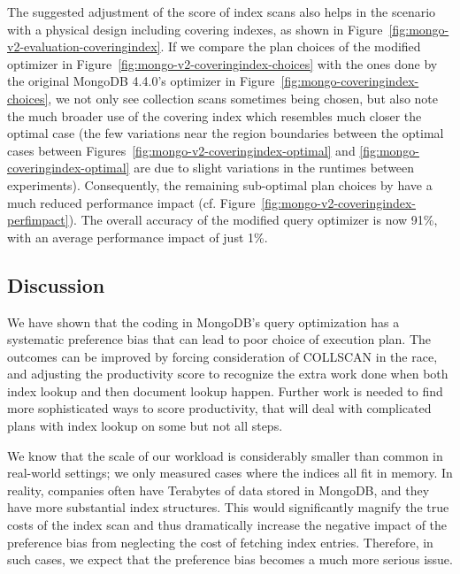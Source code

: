 The suggested adjustment of the score of index scans also helps in the scenario with a physical design including covering indexes, as shown in Figure~\ref{fig:mongo-v2-evaluation-coveringindex}. If we compare the plan choices of the modified \approachName optimizer in Figure~\ref{fig:mongo-v2-coveringindex-choices} with the ones done by the original MongoDB 4.4.0's optimizer in Figure~\ref{fig:mongo-coveringindex-choices}, we not only see collection scans sometimes being chosen, but also note the much broader use of the covering index which resembles much closer the optimal case (the few variations near the region boundaries between the optimal cases between Figures~\ref{fig:mongo-v2-coveringindex-optimal} and \ref{fig:mongo-coveringindex-optimal} are due to slight variations in the runtimes between experiments). %
Consequently, the remaining sub-optimal plan choices by \approachName have a much reduced performance impact (cf. Figure~\ref{fig:mongo-v2-coveringindex-perfimpact}).
The overall accuracy of the modified query optimizer is now 91\%, with an average performance impact of just 1\%. 


\subsection{Discussion}
We have shown that the coding in MongoDB's \approachName query optimization has a systematic preference bias that can lead to poor choice of execution plan. The outcomes can be improved by forcing consideration of COLLSCAN in the race, and adjusting the productivity score to recognize the extra work done 
when both index lookup and then document lookup happen. Further work is needed to find more sophisticated ways to score productivity, that will deal with complicated plans with index lookup on some but not all steps. 

We know that the scale of our workload 
is considerably smaller than common in real-world settings; we only measured cases where the indices all fit in memory. 
In reality, companies often have Terabytes of data
stored in MongoDB, and they have more substantial
index structures. This would significantly magnify the 
true costs of the index scan and thus dramatically 
increase the negative impact of the preference bias 
from neglecting the cost of fetching index entries. Therefore, 
in such cases, we expect that the preference bias becomes a 
much more serious issue. 


